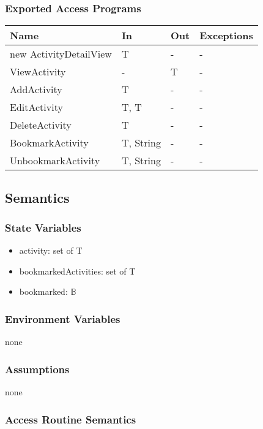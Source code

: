 \documentclass[12pt, titlepage]{article}
\begin{document}
\subsubsection{Exported Access Programs}
\begin{center}
\begin{tabular}{p{4cm} p{2cm} p{4cm} p{4cm}}
\hline
\textbf{Name} & \textbf{In} & \textbf{Out} & \textbf{Exceptions} \\
\hline
new ActivityDetailView & T & - & - \\
ViewActivity & - & T & -\\ 
AddActivity & T & - & - \\
EditActivity & T, T & - & - \\
DeleteActivity & T & - & - \\
BookmarkActivity & T, String & - & - \\
UnbookmarkActivity & T, String & - & - \\
\hline
\end{tabular}
\end{center}

\subsection{Semantics}

\subsubsection{State Variables}

\begin{itemize}
  \item activity: set of T
  \item bookmarkedActivities: set of T
  \item bookmarked: $\mathbb{B}$
\end{itemize}

\subsubsection{Environment Variables}

none

\subsubsection{Assumptions}

none

\subsubsection{Access Routine Semantics}
\end{document}
